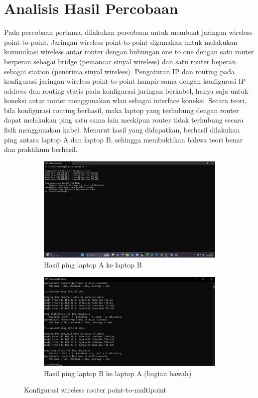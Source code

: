 \section{Analisis Hasil Percobaan}
Pada percobaan pertama, dilakukan percobaan untuk membuat jaringan wireless point-to-point. Jaringan wireless point-to-point digunakan untuk melakukan komunikasi wireless antar router dengan hubungan one to one dengan satu router berperan sebagai bridge (pemancar sinyal wireless) dan satu router beperan sebagai station (penerima sinyal wireless). Pengaturan IP dan routing pada konfigurasi jaringan wireless point-to-point hampir sama dengan konfigurasi IP address dan routing statis pada konfigurasi jaringan berkabel, hanya saja untuk koneksi antar router menggunakan wlan sebagai interface koneksi. Secara teori, bila konfigurasi routing berhasil, maka laptop yang terhubung dengan router dapat melakukan ping satu sama lain meskipun router tidak terhubung secara fisik menggunakan kabel. Menurut hasil yang didapatkan, berhasil dilakukan ping antara laptop A dan laptop B, sehingga membuktikan bahwa teori benar dan praktikum berhasil.
\begin{figure}[H]
	\centering
	\begin{subfigure}[b]{0.4\linewidth}
		\centering
		\includegraphics[width=\linewidth]{P3/img/ptp ping a.jpg}
		\caption{Hasil ping laptop A ke laptop B\label{fig:konfigurasiR1}}
	\end{subfigure}
	\begin{subfigure}[b]{0.4\linewidth}
		\centering
		\includegraphics[width=\linewidth]{P3/img/ptp ping b.jpg}
		\caption{Hasil ping laptop B ke laptop A (bagian bawah)\label{fig:konfigurasiR2}}
	\end{subfigure}
	\caption{Konfigurasi wireless router point-to-multipoint}
	\hspace{1cm}
\end{figure}

